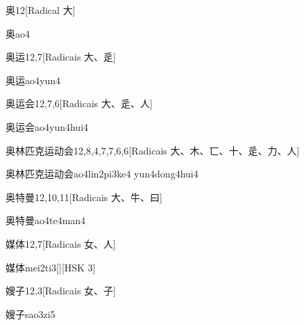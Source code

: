 \begin{entry}{奥}{12}[Radical ⼤]
  \begin{phonetics}{奥}{ao4}
  \end{phonetics}
\end{entry}

\begin{entry}{奥运}{12,7}[Radicais ⼤、⾡]
  \begin{phonetics}{奥运}{ao4yun4}
  \end{phonetics}
\end{entry}

\begin{entry}{奥运会}{12,7,6}[Radicais ⼤、⾡、⼈]
  \begin{phonetics}{奥运会}{ao4yun4hui4}
  \end{phonetics}
\end{entry}

\begin{entry}{奥林匹克运动会}{12,8,4,7,7,6,6}[Radicais ⼤、⽊、⼖、⼗、⾡、⼒、⼈]
  \begin{phonetics}{奥林匹克运动会}{ao4lin2pi3ke4 yun4dong4hui4}
  \end{phonetics}
\end{entry}

\begin{entry}{奥特曼}{12,10,11}[Radicais ⼤、⽜、⽈]
  \begin{phonetics}{奥特曼}{ao4te4man4}
  \end{phonetics}
\end{entry}

\begin{entry}{媒体}{12,7}[Radicais ⼥、⼈]
  \begin{phonetics}{媒体}{mei2ti3}[][HSK 3]
  \end{phonetics}
\end{entry}

\begin{entry}{嫂子}{12,3}[Radicais ⼥、⼦]
  \begin{phonetics}{嫂子}{sao3zi5}
  \end{phonetics}
\end{entry}

